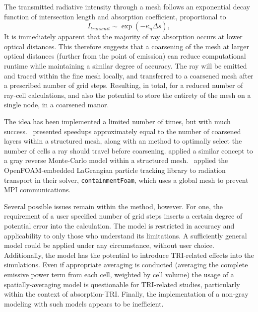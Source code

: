 The transmitted radiative intensity through a mesh follows an exponential decay function of intersection length and absorption coefficient, proportional to
\begin{equation}
     I_{transmit} \sim \exp{\left(-\kappa{}_\eta{}\Delta{s}\right)},
    \label{eq:specular_reflection}
\end{equation}
It is immediately apparent that the majority of ray absorption occurs at lower optical distances. This therefore suggests that a coarsening of the mesh at larger optical distances (further from the point of emission) can reduce computational runtime while maintaining a similar degree of accuracy.
The ray will be emitted and traced within the fine mesh locally, and transferred to a coarsened mesh after a prescribed number of grid steps.
Resulting, in total, for a reduced number of ray-cell calculations, and also the potential to store the entirety of the mesh on a single node, in a coarsened manor. 

The idea has been implemented a limited number of times, but with much success.~\citet{Silvestri2019ASimulation} presented speedups approximately equal to the number of coarsened layers within a structured mesh, along with an method to optimally select the number of cells a ray should travel before coarsening. 
\citet{Humphrey2015ATracing} applied a similar concept to a gray reverse Monte-Carlo model within a structured mesh.~\citet{Kelm2021TheTransport} applied the OpenFOAM-embedded LaGrangian particle tracking library to radiation transport in their solver, \verb|containmentFoam|, which uses a global mesh to prevent MPI communications.

Several possible issues remain within the method, however. For one, the requirement of a user specified number of grid steps inserts a certain degree of potential error into the calculation. 
The model is restricted in accuracy and applicability to only those who understand its limitations. A sufficiently general model could be applied under any circumstance, without user choice.
Additionally, the model has the potential to introduce TRI-related effects into the simulations. 
Even if appropriate averaging is conducted (averaging the complete emissive power term from each cell, weighted by cell volume) the usage of a spatially-averaging model is questionable for TRI-related studies, particularly within the context of absorption-TRI.
Finally, the implementation of a non-gray modeling with such models appears to be inefficient.


